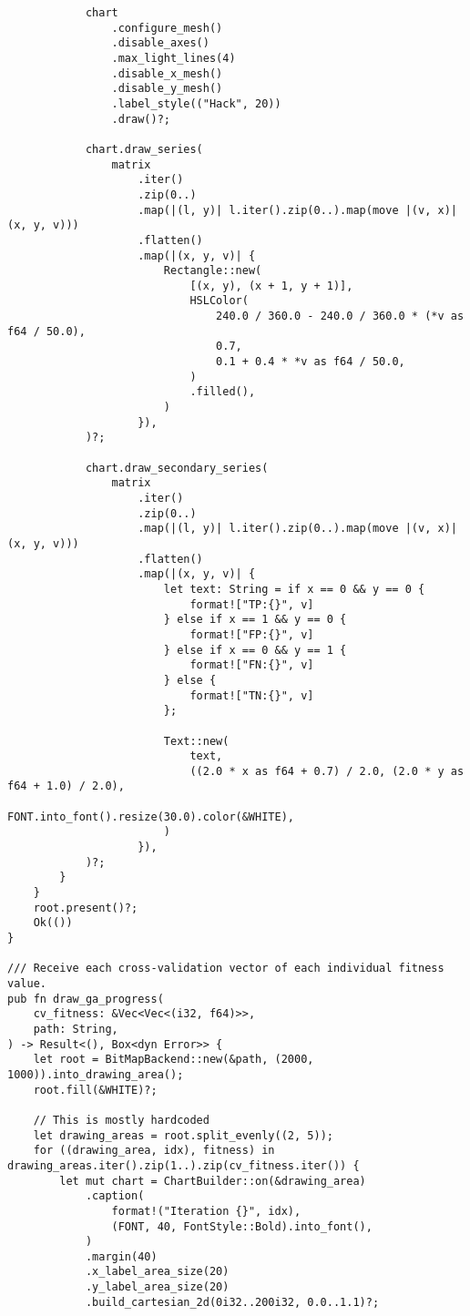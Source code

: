 \begin{code}
\begin{verbatim}
            chart
                .configure_mesh()
                .disable_axes()
                .max_light_lines(4)
                .disable_x_mesh()
                .disable_y_mesh()
                .label_style(("Hack", 20))
                .draw()?;

            chart.draw_series(
                matrix
                    .iter()
                    .zip(0..)
                    .map(|(l, y)| l.iter().zip(0..).map(move |(v, x)| (x, y, v)))
                    .flatten()
                    .map(|(x, y, v)| {
                        Rectangle::new(
                            [(x, y), (x + 1, y + 1)],
                            HSLColor(
                                240.0 / 360.0 - 240.0 / 360.0 * (*v as f64 / 50.0),
                                0.7,
                                0.1 + 0.4 * *v as f64 / 50.0,
                            )
                            .filled(),
                        )
                    }),
            )?;

            chart.draw_secondary_series(
                matrix
                    .iter()
                    .zip(0..)
                    .map(|(l, y)| l.iter().zip(0..).map(move |(v, x)| (x, y, v)))
                    .flatten()
                    .map(|(x, y, v)| {
                        let text: String = if x == 0 && y == 0 {
                            format!["TP:{}", v]
                        } else if x == 1 && y == 0 {
                            format!["FP:{}", v]
                        } else if x == 0 && y == 1 {
                            format!["FN:{}", v]
                        } else {
                            format!["TN:{}", v]
                        };

                        Text::new(
                            text,
                            ((2.0 * x as f64 + 0.7) / 2.0, (2.0 * y as f64 + 1.0) / 2.0),
                            FONT.into_font().resize(30.0).color(&WHITE),
                        )
                    }),
            )?;
        }
    }
    root.present()?;
    Ok(())
}

/// Receive each cross-validation vector of each individual fitness value.
pub fn draw_ga_progress(
    cv_fitness: &Vec<Vec<(i32, f64)>>,
    path: String,
) -> Result<(), Box<dyn Error>> {
    let root = BitMapBackend::new(&path, (2000, 1000)).into_drawing_area();
    root.fill(&WHITE)?;

    // This is mostly hardcoded
    let drawing_areas = root.split_evenly((2, 5));
    for ((drawing_area, idx), fitness) in drawing_areas.iter().zip(1..).zip(cv_fitness.iter()) {
        let mut chart = ChartBuilder::on(&drawing_area)
            .caption(
                format!("Iteration {}", idx),
                (FONT, 40, FontStyle::Bold).into_font(),
            )
            .margin(40)
            .x_label_area_size(20)
            .y_label_area_size(20)
            .build_cartesian_2d(0i32..200i32, 0.0..1.1)?;


\end{verbatim}
\end{code}
